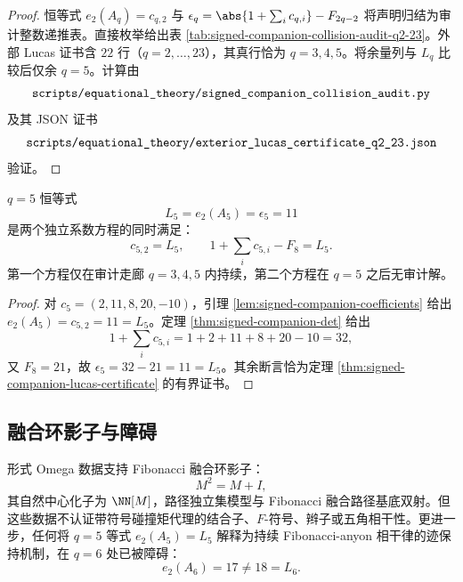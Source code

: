\documentclass[../../main.tex]{subfiles}
\begin{document}
\begin{proof}
恒等式 \(e_2(A_q)=c_{q,2}\) 与 \(\epsilon_q=\abs{1+\sum_i c_{q,i}}-F_{2q-2}\) 将声明归结为审计整数递推表。直接枚举给出表 \ref{tab:signed-companion-collision-audit-q2-23}。外部 Lucas 证书含 \(22\) 行（\(q=2,\ldots,23\)），其真行恰为 \(q=3,4,5\)。将余量列与 \(L_q\) 比较后仅余 \(q=5\)。计算由
\[
    \texttt{\detokenize{scripts/equational_theory/signed_companion_collision_audit.py}}
\]
及其 JSON 证书
\[
    \texttt{\detokenize{scripts/equational_theory/exterior_lucas_certificate_q2_23.json}}
\]
验证。
\end{proof}

\begin{corollary}[\(q=5\) 巧合的分解]\label{cor:signed-companion-q5-coincidence-split}
\(q=5\) 恒等式
\[
    L_5=e_2(A_5)=\epsilon_5=11
\]
是两个独立系数方程的同时满足：
\[
    c_{5,2}=L_5,
    \qquad
    1+\sum_i c_{5,i}-F_8=L_5.
\]
第一个方程仅在审计走廊 \(q=3,4,5\) 内持续，第二个方程在 \(q=5\) 之后无审计解。
\end{corollary}

\begin{proof}
对 \(c_5=(2,11,8,20,-10)\)，引理 \ref{lem:signed-companion-coefficients} 给出 \(e_2(A_5)=c_{5,2}=11=L_5\)。定理 \ref{thm:signed-companion-det} 给出
\[
    1+\sum_i c_{5,i}=1+2+11+8+20-10=32,
\]
又 \(F_8=21\)，故 \(\epsilon_5=32-21=11=L_5\)。其余断言恰为定理 \ref{thm:signed-companion-lucas-certificate} 的有界证书。
\end{proof}

\subsection{融合环影子与障碍}

\begin{corollary}[融合相干性未被带符号代理认证]\label{cor:signed-companion-fusion-obstruction}
形式 Omega 数据支持 Fibonacci 融合环影子：
\[
    M^2=M+I,
\]
其自然中心化子为 \(\NN[M]\)，路径独立集模型与 Fibonacci 融合路径基底双射。但这些数据不认证带符号碰撞矩代理的结合子、\(F\)-符号、辫子或五角相干性。更进一步，任何将 \(q=5\) 等式 \(e_2(A_5)=L_5\) 解释为持续 Fibonacci-anyon 相干律的迹保持机制，在 \(q=6\) 处已被障碍：
\[
    e_2(A_6)=17\neq 18=L_6.
\]
\end{corollary}
\end{document}
